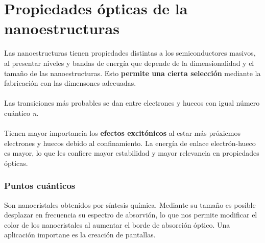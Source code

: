 \section{Propiedades ópticas de la nanoestructuras}
Las nanoestructuras tienen propiedades distintas a los semiconductores masivos, al presentar niveles y bandas de energía que depende de la dimensionalidad y el tamaño de las nanoestructuras. Esto \textbf{permite una cierta selección} mediante la fabricación con las dimensones adecuadas.\\\\
Las transiciones más probables se dan entre electrones y huecos con igual número cuántico \textit{n}.\\\\
Tienen mayor importancia los \textbf{efectos excitónicos} al estar más próxicmos electrones y huecos debido al confinamiento. La energía de enlace electrón-hueco es mayor, lo que les confiere mayor estabilidad y mayor relevancia en propiedades ópticas.
\subsubsection{Puntos cuánticos}
Son nanocristales obtenidos por síntesis química. Mediante su tamaño es posible desplazar en frecuencia su espectro de absorvión, lo que nos permite modificar el color de los nanocristales al aumentar el borde de absorción óptico. Una aplicación importane es la creación de pantallas.